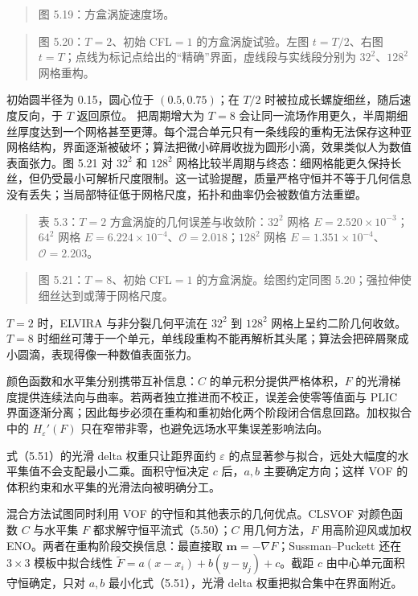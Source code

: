 \documentclass[11pt,a4paper,openany,fontset=none]{ctexbook}
\begin{document}
\begin{quote}\small 图 5.19：方盒涡旋速度场。\end{quote}

\begin{quote}\small 图 5.20：$T=2$、初始 CFL$=1$ 的方盒涡旋试验。左图 $t=T/2$、右图 $t=T$；点线为标记点给出的“精确”界面，虚线段与实线段分别为 $32^2$、$128^2$ 网格重构。\end{quote}
初始圆半径为 0.15，圆心位于 $(0.5,0.75)$；在 $T/2$ 时被拉成长螺旋细丝，随后速度反向，于 $T$ 返回原位。%
把周期增大为 $T=8$ 会让同一流场作用更久，半周期细丝厚度达到一个网格甚至更薄。每个混合单元只有一条线段的重构无法保存这种亚网格结构，界面逐渐被破坏；算法把微小碎屑收拢为圆形小滴，效果类似人为数值表面张力。图 5.21 对 $32^2$ 和 $128^2$ 网格比较半周期与终态：细网格能更久保持长丝，但仍受最小可解析尺度限制。这一试验提醒，质量严格守恒并不等于几何信息没有丢失；当局部特征低于网格尺度，拓扑和曲率仍会被数值方法重塑。

\begin{quote}\small 表 5.3：$T=2$ 方盒涡旋的几何误差与收敛阶：$32^2$ 网格 $E=2.520\times10^{-3}$；$64^2$ 网格 $E=6.224\times10^{-4}$、$\mathcal O=2.018$；$128^2$ 网格 $E=1.351\times10^{-4}$、$\mathcal O=2.203$。\end{quote}

\begin{quote}\small 图 5.21：$T=8$、初始 CFL$=1$ 的方盒涡旋。绘图约定同图 5.20；强拉伸使细丝达到或薄于网格尺度。\end{quote}
$T=2$ 时，ELVIRA 与非分裂几何平流在 $32^2$ 到 $128^2$ 网格上呈约二阶几何收敛。$T=8$ 时细丝可薄于一个单元，单线段重构不能再解析其头尾；算法会把碎屑聚成小圆滴，表现得像一种数值表面张力。

颜色函数和水平集分别携带互补信息：$C$ 的单元积分提供严格体积，$F$ 的光滑梯度提供连续法向与曲率。若两者独立推进而不校正，误差会使零等值面与 PLIC 界面逐渐分离；因此每步必须在重构和重初始化两个阶段闭合信息回路。加权拟合中的 $H_\varepsilon'(F)$ 只在窄带非零，也避免远场水平集误差影响法向。

式（5.51）的光滑 delta 权重只让距界面约 $\varepsilon$ 的点显著参与拟合，远处大幅度的水平集值不会支配最小二乘。面积守恒决定 $c$ 后，$a,b$ 主要确定方向；这样 VOF 的体积约束和水平集的光滑法向被明确分工。

混合方法试图同时利用 VOF 的守恒和其他表示的几何优点。CLSVOF 对颜色函数 $C$ 与水平集 $F$ 都求解守恒平流式（5.50）；$C$ 用几何方法，$F$ 用高阶迎风或加权 ENO。两者在重构阶段交换信息：最直接取 $\bm m=-\nabla F$；Sussman--Puckett 还在 $3\times3$ 模板中拟合线性 $\widetilde F=a(x-x_i)+b(y-y_j)+c$。截距 $c$ 由中心单元面积守恒确定，只对 $a,b$ 最小化式（5.51），光滑 delta 权重把拟合集中在界面附近。
\end{document}
